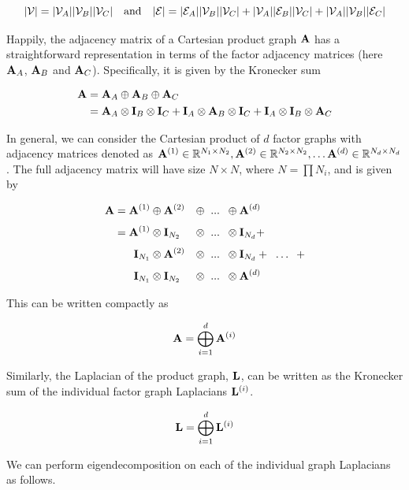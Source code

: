 $$
|\mathcal{V}| = |\mathcal{V}_A| |\mathcal{V}_B| |\mathcal{V}_C| \quad \text{and} \quad |\mathcal{E}| =  |\mathcal{E}_A| |\mathcal{V}_B| |\mathcal{V}_C| + |\mathcal{V}_A| |\mathcal{E}_B| |\mathcal{V}_C| + |\mathcal{V}_A| |\mathcal{V}_B| |\mathcal{E}_C|
$$

Happily, the adjacency matrix of a Cartesian product graph $\mathbf{A}$ has a straightforward representation in terms of the factor adjacency matrices (here $\mathbf{A}_A$, $\mathbf{A}_B$ and $\mathbf{A}_C$). Specifically, it is given by the Kronecker sum

\begin{align}
    \mathbf{A} &= \mathbf{A}_A \oplus \mathbf{A}_B \oplus \mathbf{A}_C \notag \\
    &= \mathbf{A}_A \otimes \mathbf{I}_B \otimes \mathbf{I}_C  + \mathbf{I}_A \otimes \mathbf{A}_B \otimes \mathbf{I}_C + \mathbf{I}_A \otimes \mathbf{I}_B \otimes \mathbf{A}_C
\end{align}

In general, we can consider the Cartesian product of $d$ factor graphs with adjacency matrices denoted as $\mathbf{A}^{(1)} \in \mathbb{R}^{N_1 \times N_2}, \mathbf{A}^{(2)} \in \mathbb{R}^{N_2 \times N_2}, \dots \mathbf{A}^{(d)} \in \mathbb{R}^{N_d \times N_d}$. The full adjacency matrix will have size $N \times N$, where $N = \prod N_i$, and is given by  

\begin{alignat}{4}
    \mathbf{A} = \mathbf{A}^{(1)} & \oplus \mathbf{A}^{(2)} & \oplus \;\; ... \;\; & \oplus \mathbf{A}^{(d)} \notag \\[0.1cm]
    = \mathbf{A}^{(1)} & \otimes \mathbf{I}_{N_2} & \otimes \;\; ... \;\; & \otimes \mathbf{I}_{N_d} +  \notag \\[0.1cm]
    \mathbf{I}_{N_1} & \otimes \mathbf{A}^{(2)} & \otimes \;\; ... \;\; & \otimes \mathbf{I}_{N_d} + \;\; \ldots \;\; +  \notag \\[0.1cm]
    \mathbf{I}_{N_1} & \otimes \mathbf{I}_{N_2} & \otimes \;\; ... \;\; & \otimes \mathbf{A}^{(d)}  
\end{alignat}
    
This can be written compactly as 

\begin{equation}
    \mathbf{A} = \bigoplus_{i=1}^d  \mathbf{A}^{(i)}
\end{equation}

Similarly, the Laplacian of the product graph, $\mathbf{L}$, can be written as the Kronecker sum of the individual factor graph Laplacians $\mathbf{L}^{(i)}$. 

\begin{equation}
    \mathbf{L} = \bigoplus_{i=1}^d  \mathbf{L}^{(i)}
\end{equation}

We can perform eigendecomposition on each of the individual graph Laplacians as follows. 


